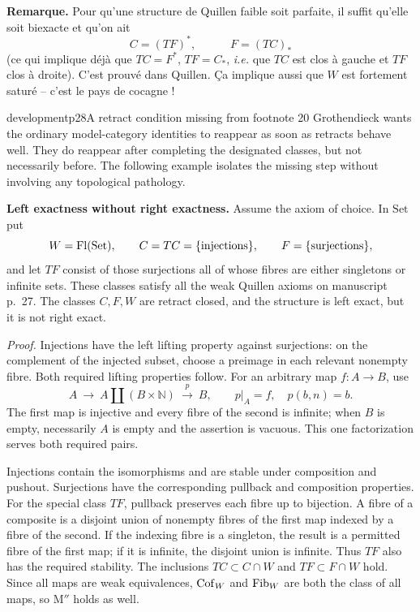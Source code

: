 \noindent\textbf{Remarque.} Pour qu'une structure de Quillen faible soit parfaite, il suffit qu'elle soit biexacte et qu'on ait
\[
C = (TF)^*, \qquad\quad F = (TC)_*
\]
(ce qui implique déjà que $TC = F^*$, $TF = C_*$, \textit{i.e.} que $TC$ est clos à gauche et $TF$ clos à droite). C'est prouvé dans Quillen. Ça implique aussi que $W$ est fortement saturé -- c'est le pays de cocagne !

\begin{dcomment}{development}{p28}{A retract condition missing from footnote 20}
Grothendieck wants the ordinary model-category identities to reappear as soon as retracts behave well. They do reappear after completing the designated classes, but not necessarily before. The following example isolates the missing step without involving any topological pathology.

\noindent\textbf{Left exactness without right exactness.}\ours\quad
Assume the axiom of choice. In $\mathrm{Set}$ put
\[
 W=\mathrm{Fl}(\mathrm{Set}),\qquad C=TC=\{\text{injections}\},
 \qquad F=\{\text{surjections}\},
\]
and let $TF$ consist of those surjections all of whose fibres are either singletons or infinite sets. These classes satisfy all the weak Quillen axioms on manuscript p.~27. The classes $C,F,W$ are retract closed, and the structure is left exact, but it is not right exact.

\emph{Proof.} Injections have the left lifting property against surjections: on the complement of the injected subset, choose a preimage in each relevant nonempty fibre. Both required lifting properties follow. For an arbitrary map $f:A\to B$, use
\[
 A\ \longrightarrow\ A\amalg(B\times\mathbb N)
 \ \xrightarrow{\ p\ }\ B,
 \qquad p|_A=f,\quad p(b,n)=b.
\]
The first map is injective and every fibre of the second is infinite; when $B$ is empty, necessarily $A$ is empty and the assertion is vacuous. This one factorization serves both required pairs.

Injections contain the isomorphisms and are stable under composition and pushout. Surjections have the corresponding pullback and composition properties. For the special class $TF$, pullback preserves each fibre up to bijection. A fibre of a composite is a disjoint union of nonempty fibres of the first map indexed by a fibre of the second. If the indexing fibre is a singleton, the result is a permitted fibre of the first map; if it is infinite, the disjoint union is infinite. Thus $TF$ also has the required stability. The inclusions $TC\subset C\cap W$ and $TF\subset F\cap W$ hold. Since all maps are weak equivalences, $\mathrm{Cof}_W$ and $\mathrm{Fib}_W$ are both the class of all maps, so $\text{M}''$ holds as well.


\end{dcomment}
